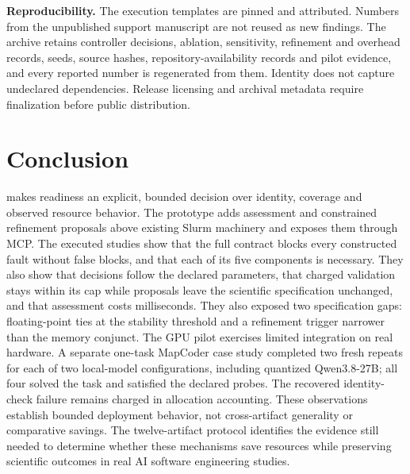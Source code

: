 \textbf{Reproducibility.} The execution templates are pinned and attributed. Numbers from the unpublished support manuscript are not reused as new findings. The archive retains controller decisions, ablation, sensitivity, refinement and overhead records, seeds, source hashes, repository-availability records and pilot evidence, and every reported number is regenerated from them. Identity does not capture undeclared dependencies. Release licensing and archival metadata require finalization before public distribution.

\section{Conclusion}\label{sec:conclusion}
\tool{} makes readiness an explicit, bounded decision over identity, coverage and observed resource behavior. The prototype adds assessment and constrained refinement proposals above existing Slurm machinery and exposes them through MCP. The executed studies show that the full contract blocks every constructed fault without false blocks, and that each of its five components is necessary. They also show that decisions follow the declared parameters, that charged validation stays within its cap while proposals leave the scientific specification unchanged, and that assessment costs milliseconds. They also exposed two specification gaps: floating-point ties at the stability threshold and a refinement trigger narrower than the memory conjunct. The GPU pilot exercises limited integration on real hardware. A separate one-task MapCoder case study completed two fresh repeats for each of two local-model configurations, including quantized Qwen3.8-27B; all four solved the task and satisfied the declared probes. The recovered identity-check failure remains charged in allocation accounting. These observations establish bounded deployment behavior, not cross-artifact generality or comparative savings. The twelve-artifact protocol identifies the evidence still needed to determine whether these mechanisms save resources while preserving scientific outcomes in real AI software engineering studies.
